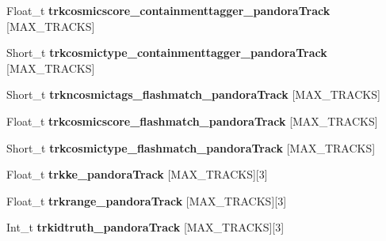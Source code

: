 \begin{DoxyCompactItemize}
\item 
\hypertarget{classanatree_aaf70426c18fe33ee7e59fded27917fd2}{Float\-\_\-t {\bfseries trkcosmicscore\-\_\-containmenttagger\-\_\-pandora\-Track} \mbox{[}M\-A\-X\-\_\-\-T\-R\-A\-C\-K\-S\mbox{]}}\label{classanatree_aaf70426c18fe33ee7e59fded27917fd2}

\item 
\hypertarget{classanatree_a84162faaef9881a405db1feeba798e38}{Short\-\_\-t {\bfseries trkcosmictype\-\_\-containmenttagger\-\_\-pandora\-Track} \mbox{[}M\-A\-X\-\_\-\-T\-R\-A\-C\-K\-S\mbox{]}}\label{classanatree_a84162faaef9881a405db1feeba798e38}

\item 
\hypertarget{classanatree_a5b74564fd30cd13b6bfa1dd2c7bb23b2}{Short\-\_\-t {\bfseries trkncosmictags\-\_\-flashmatch\-\_\-pandora\-Track} \mbox{[}M\-A\-X\-\_\-\-T\-R\-A\-C\-K\-S\mbox{]}}\label{classanatree_a5b74564fd30cd13b6bfa1dd2c7bb23b2}

\item 
\hypertarget{classanatree_ab1de853f7c86b9f526671436a6e2de40}{Float\-\_\-t {\bfseries trkcosmicscore\-\_\-flashmatch\-\_\-pandora\-Track} \mbox{[}M\-A\-X\-\_\-\-T\-R\-A\-C\-K\-S\mbox{]}}\label{classanatree_ab1de853f7c86b9f526671436a6e2de40}

\item 
\hypertarget{classanatree_ab4993ea316d2ef41425aa7dc1a4681eb}{Short\-\_\-t {\bfseries trkcosmictype\-\_\-flashmatch\-\_\-pandora\-Track} \mbox{[}M\-A\-X\-\_\-\-T\-R\-A\-C\-K\-S\mbox{]}}\label{classanatree_ab4993ea316d2ef41425aa7dc1a4681eb}

\item 
\hypertarget{classanatree_a2049a2b808b9af477b1d2381dad688cd}{Float\-\_\-t {\bfseries trkke\-\_\-pandora\-Track} \mbox{[}M\-A\-X\-\_\-\-T\-R\-A\-C\-K\-S\mbox{]}\mbox{[}3\mbox{]}}\label{classanatree_a2049a2b808b9af477b1d2381dad688cd}

\item 
\hypertarget{classanatree_a4d776d6480b303e29f417bf03bcb8dc6}{Float\-\_\-t {\bfseries trkrange\-\_\-pandora\-Track} \mbox{[}M\-A\-X\-\_\-\-T\-R\-A\-C\-K\-S\mbox{]}\mbox{[}3\mbox{]}}\label{classanatree_a4d776d6480b303e29f417bf03bcb8dc6}

\item 
\hypertarget{classanatree_a40d2f52edb643ad82ba20c86e2c74528}{Int\-\_\-t {\bfseries trkidtruth\-\_\-pandora\-Track} \mbox{[}M\-A\-X\-\_\-\-T\-R\-A\-C\-K\-S\mbox{]}\mbox{[}3\mbox{]}}\label{classanatree_a40d2f52edb643ad82ba20c86e2c74528}


\end{DoxyCompactItemize}
